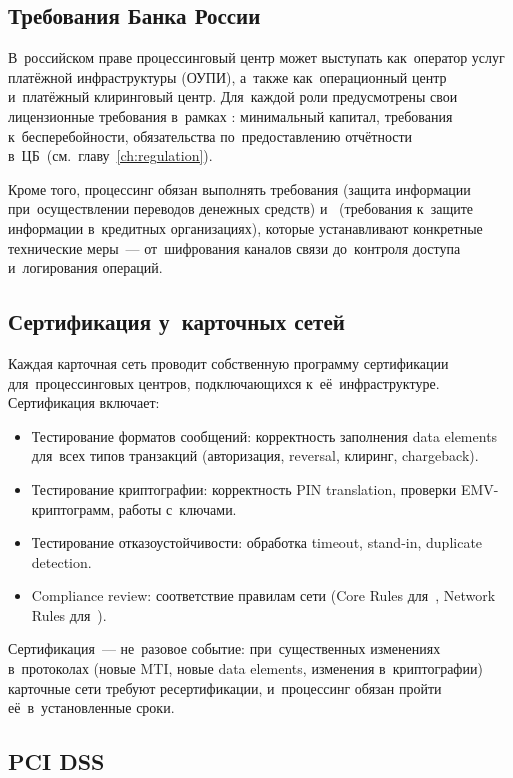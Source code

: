 \subsection*{Требования Банка России}

В~российском праве процессинговый центр может выступать
как~оператор услуг платёжной инфраструктуры (ОУПИ),
а~также как~операционный центр и~платёжный клиринговый центр.
Для~каждой роли предусмотрены свои лицензионные требования
в~рамках : минимальный капитал, требования
к~бесперебойности, обязательства по~предоставлению отчётности
в~ЦБ~(см.~главу~\ref{ch:regulation}).

Кроме того, процессинг обязан выполнять требования
 (защита информации при~осуществлении переводов
денежных средств) и~ (требования к~защите
информации в~кредитных организациях), которые устанавливают
конкретные технические меры~--- от~шифрования каналов связи
до~контроля доступа и~логирования операций.

\subsection*{Сертификация у~карточных сетей}

Каждая карточная сеть проводит собственную программу
сертификации для~процессинговых центров, подключающихся
к~её~инфраструктуре. Сертификация включает:

\begin{itemize}
  \item Тестирование форматов сообщений: корректность заполнения
        data elements  для~всех типов транзакций
        (авторизация, reversal, клиринг, chargeback).
  \item Тестирование криптографии: корректность PIN translation,
        проверки EMV-криптограмм, работы с~ключами.
  \item Тестирование отказоустойчивости: обработка timeout,
        stand-in, duplicate detection.
  \item Compliance review: соответствие правилам сети (Core Rules
        для~, Network Rules
        для~).
\end{itemize}

Сертификация~--- не~разовое событие: при~существенных изменениях
в~протоколах (новые MTI, новые data elements, изменения
в~криптографии) карточные сети требуют ресертификации,
и~процессинг обязан пройти её~в~установленные сроки.

\subsection*{PCI DSS}

